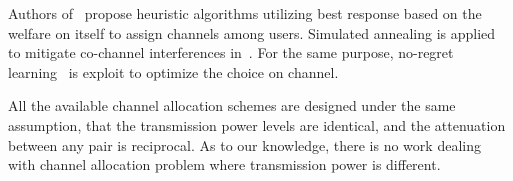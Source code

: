 \documentclass[times]{ettauth}
\theoremstyle{mytheoremstyle}
\theoremstyle{mytheoremstyle}
\theoremstyle{mytheoremstyle}
\begin{document}
Authors of~\cite{Ko_DistributedCA} propose heuristic algorithms utilizing best response based on the welfare on itself to assign channels among users.
Simulated annealing is applied to mitigate co-channel interferences in~\cite{SA_CA_TVWS_2012crowncom}.
For the same purpose, no-regret learning~\cite{qlearning_huang, hart00correlatedeq} is exploit to optimize the choice on channel.

All the available channel allocation schemes are designed under the same assumption, that the transmission power levels are identical, and the attenuation between any pair is reciprocal.
As to our knowledge, there is no work dealing with channel allocation problem where transmission power is different.






%
%
\end{document}
